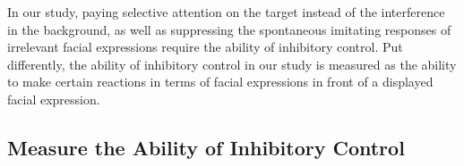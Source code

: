 In our study, paying selective attention on the target instead of the interference in the background, as well as suppressing the spontaneous imitating responses of irrelevant facial expressions require the ability of inhibitory control. Put differently, the ability of inhibitory control in our study is measured as the ability to make certain reactions in terms of facial expressions in front of a displayed facial expression. %




\subsection{Measure the Ability of Inhibitory Control}\label{subsec.measureability}
		
